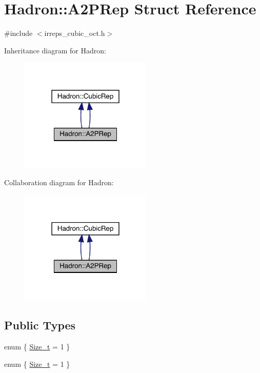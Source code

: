 \hypertarget{structHadron_1_1A2PRep}{}\section{Hadron\+:\+:A2\+P\+Rep Struct Reference}
\label{structHadron_1_1A2PRep}


{\ttfamily \#include $<$irreps\+\_\+cubic\+\_\+oct.\+h$>$}



Inheritance diagram for Hadron\+:\nopagebreak
\begin{figure}[H]
\begin{center}
\leavevmode
\includegraphics[width=178pt]{d2/dae/structHadron_1_1A2PRep__inherit__graph}
\end{center}
\end{figure}


Collaboration diagram for Hadron\+:\nopagebreak
\begin{figure}[H]
\begin{center}
\leavevmode
\includegraphics[width=178pt]{dd/dcf/structHadron_1_1A2PRep__coll__graph}
\end{center}
\end{figure}
\subsection*{Public Types}
\begin{DoxyCompactItemize}
\item 
enum \{ \mbox{\hyperlink{structHadron_1_1A2PRep_a2718300c11a500697f52054758a9ab28ae1efe7e97645fe0900f05f96b945d3f6}{Size\+\_\+t}} = 1
 \}
\item 
enum \{ \mbox{\hyperlink{structHadron_1_1A2PRep_a2718300c11a500697f52054758a9ab28ae1efe7e97645fe0900f05f96b945d3f6}{Size\+\_\+t}} = 1
 \}
\end{DoxyCompactItemize}
